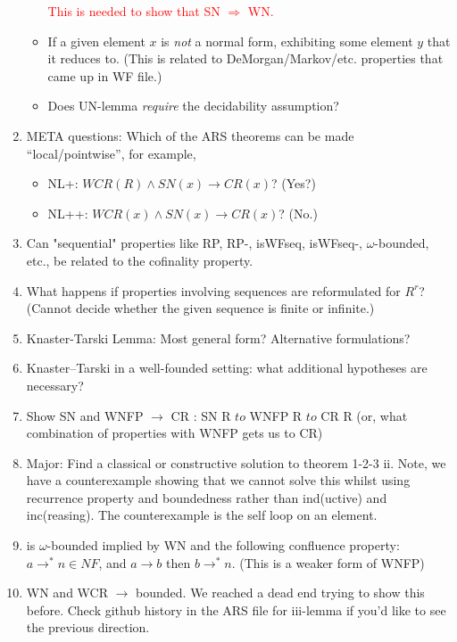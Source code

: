 \documentclass{scrartcl}
\begin{document}
\begin{enumerate}
\begin{itemize}
        {\textcolor{red}{This is needed to show that SN $\Rightarrow$ WN.}}

        \item If a given element $x$ is \emph{not} a normal form,
        exhibiting some element $y$ that it reduces to.
        (This is related to DeMorgan/Markov/etc. properties that came up in WF file.)

        \item Does UN-lemma \emph{require} the decidability assumption?
      \end{itemize}
    \item META questions: Which of the ARS theorems can be made ``local/pointwise'',
    for example,
    \begin{itemize}
      \item NL+: $WCR(R) \land SN(x) \to CR(x)$?  (Yes?)
      \item NL++: $WCR(x) \land SN(x) \to CR(x)$? (No.)
    \end{itemize}
    \item Can "sequential" properties like RP, RP-, isWFseq, isWFseq-, $\omega$-bounded, etc.,
      be related to the cofinality property.
      \item What happens if properties involving sequences are reformulated for
    $R^r$? (Cannot decide whether the given sequence is finite or infinite.)
    \item Knaster-Tarski Lemma: Most general form? Alternative formulations?
    \item Knaster--Tarski in a well-founded setting: what additional
    hypotheses are necessary?
    \item Show SN and WNFP $\to$ CR : SN R $to$ WNFP R $to$ CR R (or, what combination of properties with WNFP gets us to CR)
    \item Major: Find a classical or constructive solution to theorem 1-2-3 ii. Note, we have a counterexample showing that we
    cannot solve this whilst using recurrence property and boundedness rather than ind(uctive) and inc(reasing). The counterexample is the self loop on an element.
    \item is $\omega$-bounded implied by WN and the following confluence property:
    $a \to^* n \in NF$, and $a \to b$ then $b \to^* n $. (This is a weaker form of WNFP)
    \item WN and WCR $\to$ bounded. We reached a dead end trying to show this before. Check github history in the ARS file for iii-lemma
    if you'd like to see the previous direction.
  \end{enumerate}
\end{document}
